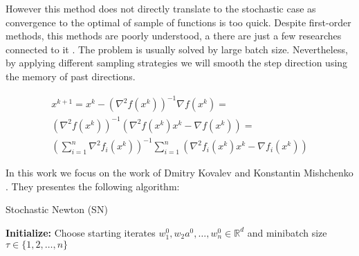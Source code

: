 \documentclass{article}
\begin{document}
However this method does not directly translate to the stochastic case as convergence to the optimal of sample of functions is too quick. Despite first-order methods, this methods are poorly understood, a there are just a few researches connected to it \cite{litlink3}. The problem is usually solved by large batch size. Nevertheless, by applying different sampling strategies we will smooth the step direction using the memory of past directions.

\begin{equation}
\begin{multlined}
    x^{k+1} = x^k - \left(\nabla^2f\left(x^k\right)\right)^{-1}\nabla f\left(x^k\right) = \\
    \left(\nabla^2f\left(x^k\right)\right)^{-1}\left(\nabla^2f\left(x^k\right)x^k - \nabla f\left(x^k\right)\right) = \\
    \left(\sum\limits_{i=1}^n\nabla^2f_i\left(x^k\right)\right)^{-1}\sum\limits_{i=1}^n \left(\nabla^2f_i\left(x^k\right)x^k - \nabla f_i\left(x^k\right)\right)
\end{multlined}
\end{equation}

In this work we focus on the work of Dmitry Kovalev and Konstantin Mishchenko \cite{litlink4}. They presentes the following algorithm:

\begin{algorithm}\label{eq:algorithm}
\caption{Stochastic Newton (SN)}\label{alg:cap}
\begin{algorithmic}
\State \textbf{Initialize:} Choose starting iterates $w_1^0, w_2a^0, \dots, w_n^0 \in \mathbb{R}^d$ and minibatch size $\tau \in \{1, 2, \dots, n\}$
 \Do
 
\EndFor
\end{algorithmic}
\end{algorithm}


\end{document}
